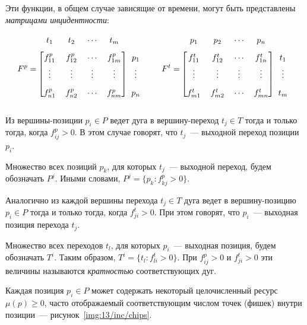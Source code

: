 Эти функции, в общем случае зависящие от времени, могут быть представлены \textit{матрицами инцидентности}:
%
\begin{equation*}
    \renewcommand*{\arraystretch}{1.75}
    F^p = \begin{blockarray}{ccccc}
        t_1 & t_2 & \cdots & t_m & \\
        \begin{block}{[cccc]c}
          f_{11}^p & f_{12}^p & \cdots & f_{1m}^p & p_1\\
          \vdots & \vdots & \vdots & \vdots & \vdots\\
          f_{n1}^p & f_{n2}^p & \cdots & f_{nm}^p & p_n\\
        \end{block}
        \end{blockarray}
        \quad\quad
    F^t = \begin{blockarray}{ccccc}
        p_1 & p_2 & \cdots & p_n & \\
        \begin{block}{[cccc]c}
          f_{11}^t & f_{12}^t & \cdots & f_{1n}^t & t_1\\
          \vdots & \vdots & \vdots & \vdots & \vdots\\
          f_{m1}^t & f_{m2}^t & \cdots & f_{mn}^t & t_m\\
        \end{block}
        \end{blockarray}
\end{equation*}
%
Из вершины-позиции ${p_i\in P}$ ведет дуга в вершину-переход ${t_j\in T}$ тогда и только тогда, когда ${f_{ij}^p > 0}$. В этом случае говорят, что $t_j$~--- выходной переход позиции $p_i$.

Множество всех позиций $p_k$, для которых $t_j$~--- выходной переход, будем обозначать $P^j$. Иными словами, ${P^j = \{p_k\colon f_{kj}^p > 0 \}}$.

Аналогично из каждой вершины перехода ${t_j\in T}$ дуга ведет в вершину-позицию ${p_i\in P}$ тогда и только тогда, когда ${f_{ji}^t > 0}$. При этом говорят, что $p_i$~--- выходная позиция перехода $t_j$. 

Множество всех переходов $t_l$, для которых $p_i$~--- выходная позиция, будем обозначать $T^i$. Таким образом, ${T^i = \{ t_l\colon f_{li}^t > 0 \}}$. При ${f_{ij}^p > 0}$ и ${f_{ji}^t > 0}$ эти величины называются \textit{кратностью} соответствующих дуг.

Каждая позиция ${p_i\in P}$ может содержать некоторый целочисленный ресурс ${\mu(p)\geqslant 0}$, часто отображаемый соответствующим числом точек (фишек) внутри позиции~--- рисунок~\ref{img:13/inc/chips}.

